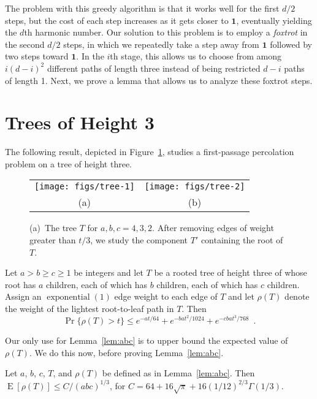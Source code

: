 \documentclass[a4paper,UKenglish]{lipics-v2016}
\DeclareMathOperator{\E}{E}
\DeclareMathOperator{\exponential}{exponential}
\newcommand{\one}{\mathbf{1}}
\begin{document}
The problem with this greedy algorithm is that it works well for the
first $d/2$ steps, but the cost of each step increases as it gets closer
to $\one$, eventually yielding the $d$th harmonic number.  Our solution
to this problem is to employ a \emph{foxtrot} in the second $d/2$ steps,
in which we repeatedly take a step away from $\one$ followed by two steps
toward $\one$.  In the $i$th stage, this allows us to choose from among
$i(d-i)^2$ different paths of length three instead of being restricted
$d-i$ paths of length 1. Next, we prove a lemma that allows us to analyze these foxtrot steps.


\section{Trees of Height 3}
\label{sec:abc}

The following result, depicted in Figure~\ref{fig:tree}, studies a
first-passage percolation problem on a tree of height three.

\begin{figure}
   \begin{center}
     \begin{tabular}{cc}
       \texttt{[image: figs/tree-1]} & \texttt{[image: figs/tree-2]} \\
       (a) & (b)
     \end{tabular}
   \end{center}
   \caption{(a)~The tree $T$ for $a,b,c=4,3,2$.  After removing edges of weight greater than $t/3$, we study the component $T'$ containing the root of $T$.}
   \label{fig:tree}
\end{figure}


\begin{lemma}\label{lem:abc}
Let $a>b\ge c\ge 1$ be integers and let $T$ be a rooted tree of height
three of whose root has $a$ children, each of which has $b$ children,
each of which has $c$ children.  Assign an $\exponential(1)$ edge weight
to each edge of $T$ and let $\rho(T)$ denote the weight of the lightest
root-to-leaf path in $T$.  Then
\[
    \Pr\{\rho(T) > t\} \le e^{-at/64} + e^{-bat^2/1024} + e^{-cbat^3/768} \enspace .
\] 
\end{lemma}

Our only use for Lemma~\ref{lem:abc} is to upper bound the expected
value of $\rho(T)$.  We do this now, before proving
Lemma~\ref{lem:abc}.

\begin{corollary}\label{cor:expectation}
  Let $a$, $b$, $c$, $T$, and $\rho(T)$ be defined as in Lemma~\ref{lem:abc}.  Then $\E[\rho(T)] \le C/(abc)^{1/3}$, for
  $C=64 + 16\sqrt{\pi} + 16(1/12)^{2/3}\Gamma(1/3)$.
\end{corollary}
\end{document}
